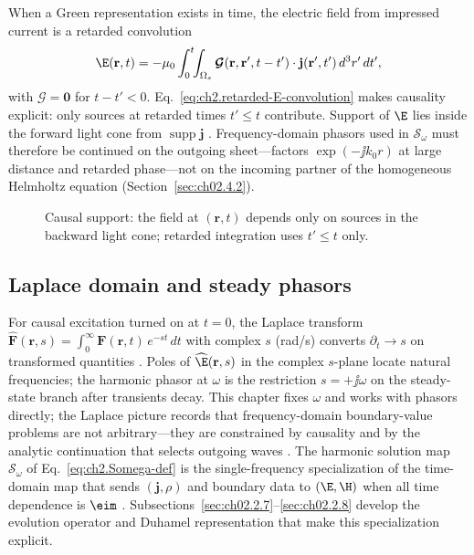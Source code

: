 When a Green representation exists in time, the electric field from impressed current is a retarded convolution \cite{stratton1941,jackson1999}
\begin{equation}
\label{eq:ch2.retarded-E-convolution}
\E(\mathbf{r},t)
=
-\mu_0\int_0^t\!\!\int_{\Omega_s}
\boldsymbol{\mathcal{G}}(\mathbf{r},\mathbf{r}',t-t')\cdot\mathbf{j}(\mathbf{r}',t')\,d^3r'\,dt',
\end{equation}
with $\boldsymbol{\mathcal{G}}=\mathbf{0}$ for $t-t'<0$. Eq.~\eqref{eq:ch2.retarded-E-convolution} makes causality explicit: only sources at retarded times $t'\le t$ contribute. Support of $\E$ lies inside the forward light cone from $\operatorname{supp}\mathbf{j}$ \cite{maxwell1873}. Frequency-domain phasors used in $\mathcal{S}_\omega$ must therefore be continued on the outgoing sheet---factors $\exp(-\jj k_0 r)$ at large distance and retarded phase---not on the incoming partner of the homogeneous Helmholtz equation (Section~\ref{sec:ch02.4.2}).

\begin{figure}[t]
\centering
{}
\caption{Causal support: the field at $(\mathbf{r},t)$ depends only on sources in the backward light cone; retarded integration uses $t'\le t$ only.}
\label{fig:ch2.causal-light-cone}
\end{figure}

\subsection{Laplace domain and steady phasors}
\label{sec:ch02.2.6}

For causal excitation turned on at $t=0$, the Laplace transform $\widehat{\mathbf{F}}(\mathbf{r},s)=\int_0^\infty \mathbf{F}(\mathbf{r},t)\,e^{-st}\,dt$ with complex $s$ (rad/s) converts $\partial_t\to s$ on transformed quantities \cite{stratton1941,jackson1999}. Poles of $\widehat{\E}(\mathbf{r},s)$ in the complex $s$-plane locate natural frequencies; the harmonic phasor at $\omega$ is the restriction $s=+\jj\omega$ on the steady-state branch after transients decay. This chapter fixes $\omega$ and works with phasors directly; the Laplace picture records that frequency-domain boundary-value problems are not arbitrary---they are constrained by causality and by the analytic continuation that selects outgoing waves \cite{stratton1941}. The harmonic solution map $\mathcal{S}_\omega$ of Eq.~\eqref{eq:ch2.Somega-def} is the single-frequency specialization of the time-domain map that sends $(\mathbf{j},\rho)$ and boundary data to $(\E,\H)$ when all time dependence is $\eim$ \cite{stratton1941,harrington2001}. Subsections~\ref{sec:ch02.2.7}--\ref{sec:ch02.2.8} develop the evolution operator and Duhamel representation that make this specialization explicit.
